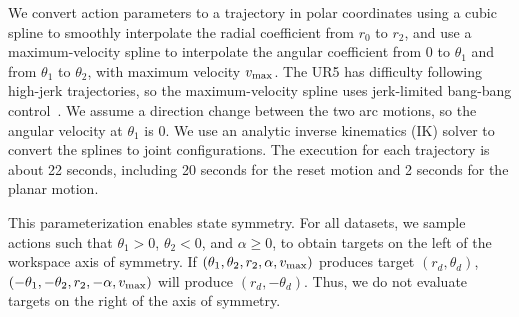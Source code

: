 \documentclass[letterpaper, 10pt, conference]{ieeeconf}  %
\newcommand{\ba}{\mathbf{a}}
\newcommand{\vmax}{v_{\rm max}}
\newcommand{\remark}[3]{{\color{#2}[#1: #3]}}
\newcommand{\Vincent}[1]{\remark{Vincent}{purple}{#1}}
\newcommand{\ale}[1]{\remark{Alejandro}{turquoise}{#1}}
\begin{document}
We convert action parameters to a trajectory in polar coordinates using a cubic spline to smoothly interpolate the radial coefficient from $r_0$ to $r_2$, and use a maximum-velocity spline to interpolate the angular coefficient from $0$ to $\theta_1$ and from $\theta_1$ to $\theta_2$, with maximum velocity $\vmax$. %
The UR5 has difficulty following high-jerk trajectories, so the maximum-velocity spline uses jerk-limited bang-bang control~\cite{ichnowski2020djgomp}. We assume a direction change between the two arc motions, so the angular velocity at $\theta_1$ is 0. 
We use an analytic inverse kinematics (IK) solver to convert the splines to joint configurations. The execution for each trajectory is about 22 seconds, including  20 seconds for the reset motion and 2 seconds for the planar motion.

This parameterization enables state symmetry. For all datasets, we sample actions such that $\theta_1 > 0$, $\theta_2 < 0$, and $\alpha \geq 0$, to obtain targets on the left of the workspace axis of symmetry. If $(\theta_1, \theta_2, r_2, \alpha, \vmax)$ produces target $(r_d, \theta_d)$, $(-\theta_1, -\theta_2, r_2, -\alpha, \vmax)$ will produce $(r_d, -\theta_d)$. Thus, we do not evaluate targets on the right of the axis of symmetry.


\end{document}
